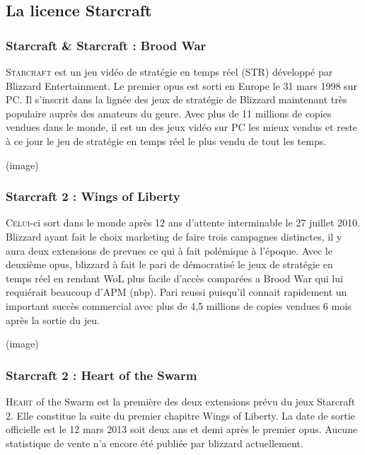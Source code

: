 \subsection{La licence Starcraft}%
\label{sub:la_licence_starcraft}

\subsubsection{Starcraft \& Starcraft : Brood War}%
\label{ssub:starcraft_&_starcraft_brood_war}

\lettrine{S}{tarcraft} est un jeu vidéo de stratégie en temps réel (STR) développé
par Blizzard Entertainment. Le premier opus est sorti en Europe le 31
mars 1998 sur PC. Il s'inscrit dans la lignée des jeux de stratégie de
Blizzard maintenant très populaire auprès des amateurs du genre. Avec
plus de 11 millions de copies vendues dans le monde, il est un des
jeux vidéo sur PC les mieux vendus et reste à ce jour le jeu de
stratégie en temps réel le plus vendu de tout les temps.

(image)

\subsubsection{Starcraft 2 : Wings of Liberty}%
\label{ssub:starcraft_2_wings_of_liberty}

\lettrine{C}{elui}-ci sort dans le monde après 12 ans d'attente
interminable le 27 juillet 2010. Blizzard ayant fait le choix marketing
de faire trois campagnes distinctes, il y aura deux extensions de
prevues ce qui à fait polémique à l'époque. Avec le deuxième opus,
blizzard à fait le pari de démocratisé le jeux de stratégie en temps
réel en rendant WoL plus facile d'accès comparées a Brood War qui lui
requiérait beaucoup d'APM (nbp). Pari reussi puisqu'il connait
rapidement un important succès commercial avec plus de 4,5 millions de
copies vendues 6 mois après la sortie du jeu.

(image)

\subsubsection{Starcraft 2 : Heart of the Swarm}%
\label{ssub:starcraft_2_heart_of_the_swarm}

\lettrine{H}{eart} of the Swarm est la première des deux extensions
prévu du jeux Starcraft 2. Elle constitue la suite du premier chapitre
Wings of Liberty. La date de sortie officielle est le 12 mars 2013 soit
deux ans et demi après le premier opus.  Aucune statistique de vente n'a
encore été publiée par blizzard actuellement.

